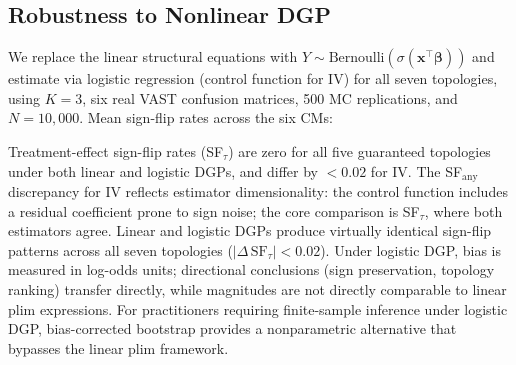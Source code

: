 \subsection{Robustness to Nonlinear DGP}
\label{sec:logistic_dgp}

We replace the linear structural equations with $Y \sim \text{Bernoulli}(\sigma(\mathbf{x}^\top\boldsymbol{\beta}))$ and estimate via logistic regression (control function for IV) for all seven topologies, using $K{=}3$, six real VAST confusion matrices, 500 MC replications, and $N{=}10{,}000$. Mean sign-flip rates across the six CMs:

\begin{center}
\small
{}
\end{center}

Treatment-effect sign-flip rates (SF$_\tau$) are zero for all five guaranteed topologies under both linear and logistic DGPs, and differ by $< 0.02$ for IV. The SF$_\text{any}$ discrepancy for IV reflects estimator dimensionality: the control function includes a residual coefficient prone to sign noise; the core comparison is SF$_\tau$, where both estimators agree. Linear and logistic DGPs produce virtually identical sign-flip patterns across all seven topologies ($|\Delta\,\text{SF}_\tau| < 0.02$). Under logistic DGP, bias is measured in log-odds units; directional conclusions (sign preservation, topology ranking) transfer directly, while magnitudes are not directly comparable to linear plim expressions. For practitioners requiring finite-sample inference under logistic DGP, bias-corrected bootstrap provides a nonparametric alternative that bypasses the linear plim framework.

